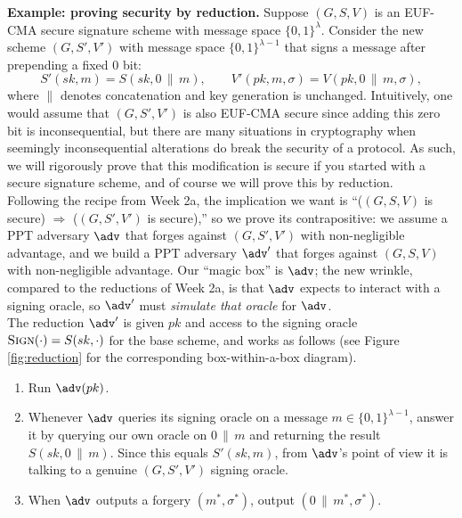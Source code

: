 \documentclass[12pt]{article}
\theoremstyle{definition}
\theoremstyle{remark}
\theoremstyle{definition}
\begin{document}
\textbf{Example: proving security by reduction.} Suppose $(G, S, V)$ is an EUF-CMA secure signature scheme with message space $\{0,1\}^\lambda$. Consider the new scheme $(G, S', V')$ with message space $\{0,1\}^{\lambda-1}$ that signs a message after prepending a fixed $0$ bit: $$S'(sk, m) = S(sk, 0\,\|\,m), \qquad V'(pk, m, \sigma) = V(pk, 0\,\|\,m, \sigma),$$ where $\|$ denotes concatenation and key generation is unchanged. Intuitively, one would assume that $(G, S', V')$ is also EUF-CMA secure since adding this zero bit is inconsequential, but there are many situations in cryptography when seemingly inconsequential alterations do break the security of a protocol. As such, we will rigorously prove that this modification is secure if you started with a secure signature scheme, and of course we will prove this by reduction.\\

Following the recipe from Week 2a, the implication we want is ``($(G,S,V)$ is secure) $\Rightarrow$ ($(G,S',V')$ is secure),'' so we prove its contrapositive: we assume a PPT adversary $\adv$ that forges against $(G,S',V')$ with non-negligible advantage, and we build a PPT adversary $\adv'$ that forges against $(G,S,V)$ with non-negligible advantage. Our ``magic box'' is $\adv$; the new wrinkle, compared to the reductions of Week 2a, is that $\adv$ expects to interact with a signing oracle, so $\adv'$ must \emph{simulate that oracle} for $\adv$.\\

The reduction $\adv'$ is given $pk$ and access to the signing oracle ${\normalfont\textsc{Sign}}(\cdot) = S(sk, \cdot)$ for the base scheme, and works as follows (see Figure \ref{fig:reduction} for the corresponding box-within-a-box diagram).
\begin{enumerate}[(1)]
\item Run $\adv(pk)$.
\item Whenever $\adv$ queries its signing oracle on a message $m \in \{0,1\}^{\lambda-1}$, answer it by querying our own oracle on $0\,\|\,m$ and returning the result $S(sk, 0\,\|\,m)$. Since this equals $S'(sk, m)$, from $\adv$'s point of view it is talking to a genuine $(G,S',V')$ signing oracle.
\item When $\adv$ outputs a forgery $(m^*, \sigma^*)$, output $(0\,\|\,m^*, \sigma^*)$.
\end{enumerate}
\end{document}

